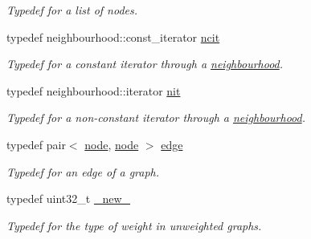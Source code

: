 \begin{DoxyCompactItemize}
\begin{DoxyCompactList}\small\item\em Typedef for a list of nodes. \end{DoxyCompactList}\item 
typedef neighbourhood\+::const\+\_\+iterator \hyperlink{namespacelgraph_1_1utils_a7207b078932845778282f5e2e373575b}{ncit}\hypertarget{namespacelgraph_1_1utils_a7207b078932845778282f5e2e373575b}{}\label{namespacelgraph_1_1utils_a7207b078932845778282f5e2e373575b}

\begin{DoxyCompactList}\small\item\em Typedef for a constant iterator through a \hyperlink{namespacelgraph_1_1utils_ac52fa2c52f47820841e83a3da5d308bc}{neighbourhood}. \end{DoxyCompactList}\item 
typedef neighbourhood\+::iterator \hyperlink{namespacelgraph_1_1utils_af5daf6fe356a9014746bdb507787ae01}{nit}\hypertarget{namespacelgraph_1_1utils_af5daf6fe356a9014746bdb507787ae01}{}\label{namespacelgraph_1_1utils_af5daf6fe356a9014746bdb507787ae01}

\begin{DoxyCompactList}\small\item\em Typedef for a non-\/constant iterator through a \hyperlink{namespacelgraph_1_1utils_ac52fa2c52f47820841e83a3da5d308bc}{neighbourhood}. \end{DoxyCompactList}\item 
typedef pair$<$ \hyperlink{namespacelgraph_1_1utils_ab9c6b34241f0b68372c55f34c460e863}{node}, \hyperlink{namespacelgraph_1_1utils_ab9c6b34241f0b68372c55f34c460e863}{node} $>$ \hyperlink{namespacelgraph_1_1utils_a6510284ce1b1ae5dc97ce5d2de426e10}{edge}\hypertarget{namespacelgraph_1_1utils_a6510284ce1b1ae5dc97ce5d2de426e10}{}\label{namespacelgraph_1_1utils_a6510284ce1b1ae5dc97ce5d2de426e10}

\begin{DoxyCompactList}\small\item\em Typedef for an edge of a graph. \end{DoxyCompactList}\item 
typedef uint32\+\_\+t \hyperlink{namespacelgraph_1_1utils_a2c84bfde888c42ab3ad6b2cb8a364240}{\+\_\+new\+\_\+}\hypertarget{namespacelgraph_1_1utils_a2c84bfde888c42ab3ad6b2cb8a364240}{}\label{namespacelgraph_1_1utils_a2c84bfde888c42ab3ad6b2cb8a364240}

\begin{DoxyCompactList}\small\item\em Typedef for the type of weight in unweighted graphs. \end{DoxyCompactList}\end{DoxyCompactItemize}
